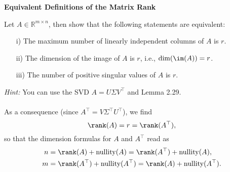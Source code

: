 \textbf{\normalsize Equivalent Definitions of the Matrix Rank}

Let $A \in \mathbb{R}^{m \times n}$, then show that the following statements are equivalent:
\begin{itemize}
	\item[i)] The maximum number of linearly independent columns of $A$ is $r$.
	\item[ii)] The dimension of the image of $A$ is $r$, i.e., $\dim(\im(A)) = r$.
	\item[iii)] The number of positive singular values of $A$ is $r$.
\end{itemize}
\textit{Hint:} You can use the SVD $A=U\Sigma V^\top$ and Lemma 2.29.\\~\\
{\color{navy}As a consequence (since $A^\top = V\Sigma^\top U^\top$), we find 
$$\rank(A) = r=\rank(A^\top),  $$
so that the dimension formulas for $A$ and $A^\top$ read as
\begin{align*}
n &= \rank(A) + \text{nullity}(A)= \rank(A^\top) + \text{nullity}(A),\\
m &= \rank(A^\top) + \text{nullity}(A^\top)=\rank(A) + \text{nullity}(A^\top).\\
\end{align*}
}
